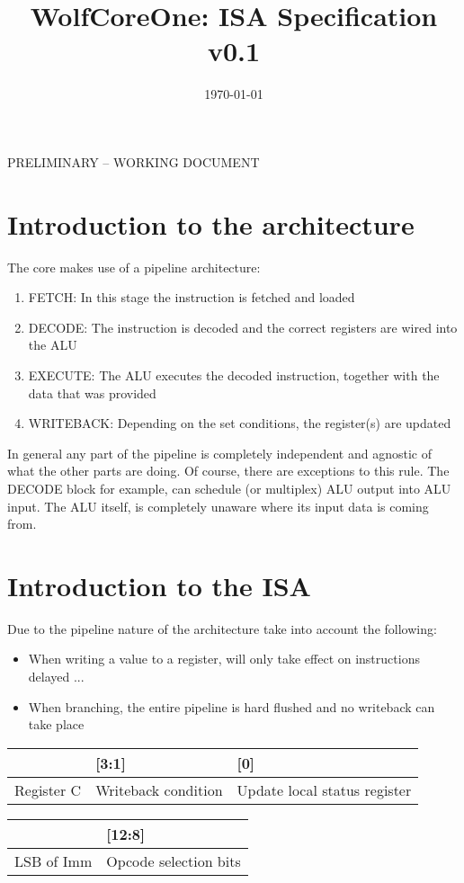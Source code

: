 \documentclass[a4paper,11pt]{article}
\begin{document}
\title{WolfCoreOne: ISA Specification v0.1}
\author{}
\date{\today}
\maketitle
PRELIMINARY -- WORKING DOCUMENT
\section{Introduction to the architecture}
The core makes use of a pipeline architecture:
\begin{enumerate}
    \item FETCH: In this stage the instruction is fetched and loaded
    \item DECODE: The instruction is decoded and the correct registers are wired into the ALU
    \item EXECUTE: The ALU executes the decoded instruction, together with the data that was provided
    \item WRITEBACK: Depending on the set conditions, the register(s) are updated
\end{enumerate}
In general any part of the pipeline is completely independent and agnostic of what the other
parts are doing. Of course, there are exceptions to this rule. The DECODE block for example, can schedule
(or multiplex) ALU output into ALU input. The ALU itself, is completely unaware where its input data is coming from.

\section{Introduction to the ISA}
Due to the pipeline nature of the architecture take into account the following:
\begin{itemize}
    \item When writing a value to a register, will only take effect on instructions delayed ... 
    \item When branching, the entire pipeline is hard flushed and no writeback can take place
\end{itemize}

\begin{table}
	\begin{center}
	\begin{tabular}{|C{8cm}|C{6cm}|C{2cm}|}
		\hline
		[7:4] & [3:1] & [0] \\ \hline 
		Register C & Writeback condition & Update local status register \\ \hline \hline
	\end{tabular}
	\begin{tabular}{|C{6cm}|C{2cm}|}
		\hline
		[15:13] & [12:8] \\ \hline
		LSB of Imm & Opcode selection bits \\ \hline \hline
	\end{tabular}
	\end{center}
\end{table}
\end{document}

